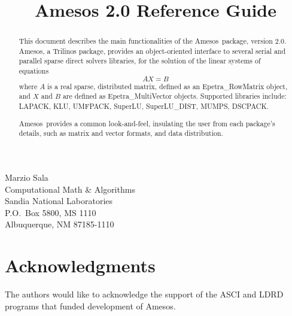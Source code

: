 \documentclass[11pt]{SANDreport}
\title{Amesos 2.0 Reference Guide}
\newcommand{\amesos}{{\sc Amesos}}
\begin{document}
\maketitle

\begin{center}
Marzio  Sala \\
Computational Math \& Algorithms \\
Sandia National Laboratories\\
P.O.~Box 5800, MS 1110 \\
Albuquerque, NM 87185-1110
\end{center}

\vspace{20pt}

\begin{abstract}
  This document describes the main functionalities of the \amesos\ package,
  version 2.0. \amesos, a Trilinos package, provides an
  object-oriented interface to several serial and parallel sparse direct
  solvers libraries, for the solution of the linear systems of equations
  \begin{equation}
    \label{eq:linear_system}
    A X = B
  \end{equation}
  where $A$ is a real sparse, distributed matrix, defined as an
  Epetra\_RowMatrix object, and $X$ and $B$ are defined as
  Epetra\_MultiVector objects. Supported libraries include:
  LAPACK, KLU, UMFPACK, SuperLU, SuperLU\_DIST, MUMPS, DSCPACK.
  
  \amesos\ provides a common look-and-feel,
  insulating the user from each package's details, such as matrix and
  vector formats, and data distribution.
\end{abstract}

\clearpage

\clearpage

\section*{Acknowledgments}
The authors would like to acknowledge the support of the ASCI and LDRD programs
that funded development of \amesos.

\clearpage

\SANDmain


\tableofcontents

\clearpage
\end{document}
